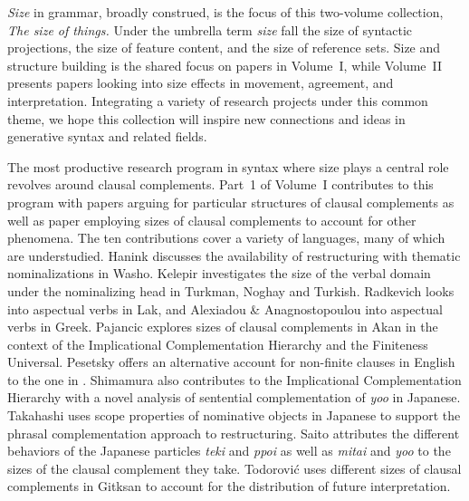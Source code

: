 

\textit{Size} in grammar, broadly construed, is the focus of this two-volume collection, \textit{The size of things.}
Under the umbrella term \textit{size} fall the size of syntactic projections, the size of feature content, and the size of  reference sets. 
Size and structure building is the shared focus on papers in Volume~I, while Volume~II presents papers looking into size effects in movement, agreement, and interpretation. 
Integrating a variety of research projects under this common theme, we hope this collection will inspire new connections and ideas in generative syntax and related fields. 

The most productive research program in syntax where size plays a central role revolves around clausal complements. 
Part~1 of Volume~I contributes to this program with papers arguing for particular structures of clausal complements as well as paper employing sizes of clausal complements to account for other phenomena. 
The ten contributions cover a variety of languages, many of which are understudied. 
Hanink discusses the availability of restructuring with thematic nominalizations in Washo. 
Kelepir investigates the size of the verbal domain under the nominalizing head in Turkman, Noghay and Turkish. 
Radkevich looks into aspectual verbs in Lak, and Alexiadou \& Anagnostopoulou into aspectual verbs in Greek.
Pajancic explores sizes of clausal complements in Akan in the context of the Implicational Complementation Hierarchy and the Finiteness Universal. 
Pesetsky offers an alternative account for non-finite clauses in English to the one in \cite{Wurmbrand:2014}.
Shimamura also contributes to the Implicational Complementation Hierarchy with a novel analysis of sentential complementation of \textit{yoo} in Japanese. 
Takahashi uses scope properties of nominative objects in Japanese to support the phrasal complementation approach to restructuring. 
Saito attributes the different behaviors of the Japanese particles \textit{teki} and \textit{ppoi} as well as \textit{mitai} and \textit{yoo} to the sizes of the clausal complement they take.
Todorović uses different sizes of clausal complements in Gitksan to account for the distribution of future interpretation. 

